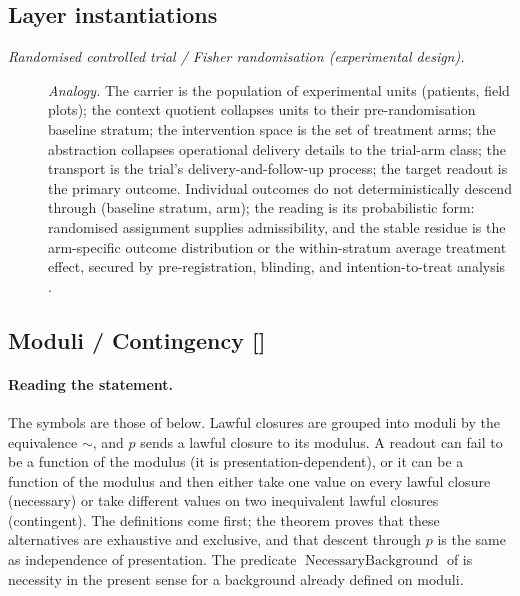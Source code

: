 \subsection*{Layer instantiations}\label{layer-inst:F25}

\begingroup\small
\begin{description}
\item[\emph{Randomised controlled trial / Fisher
randomisation (experimental design).}] \textit{Analogy.}
The carrier is the population of experimental units
(patients, field plots); the context quotient collapses
units to their pre-randomisation baseline stratum; the
intervention space is the set of treatment arms; the
abstraction collapses operational delivery details to
the trial-arm class; the transport is the trial's
delivery-and-follow-up process; the target readout is
the primary outcome.  Individual outcomes do not
deterministically descend through (baseline stratum,
arm); the  reading is its probabilistic form:
randomised assignment supplies admissibility, and the
stable residue is the arm-specific outcome distribution
or the within-stratum average treatment effect, secured
by pre-registration, blinding, and intention-to-treat
analysis \citep{Fisher1935DesignExperiments}.

\end{description}
\endgroup


\subsection{Moduli / Contingency [\texorpdfstring{}{F26}]}\label{sec:status-records-coherence:moduli}

\paragraph{Reading the statement.} The symbols are those of  below.
Lawful closures are grouped into moduli by the equivalence \(\sim\), and
\(p\) sends a lawful closure to its modulus. A readout can fail to be a
function of the modulus (it is presentation-dependent), or it can be a
function of the modulus and then either take one value on every lawful
closure (necessary) or take different values on two inequivalent lawful
closures (contingent). The definitions come first; the theorem proves that
these alternatives are exhaustive and exclusive, and that descent through
\(p\) is the same as independence of presentation. The predicate
\(\operatorname{NecessaryBackground}\) of  is necessity in the
present sense for a background already defined on moduli.

